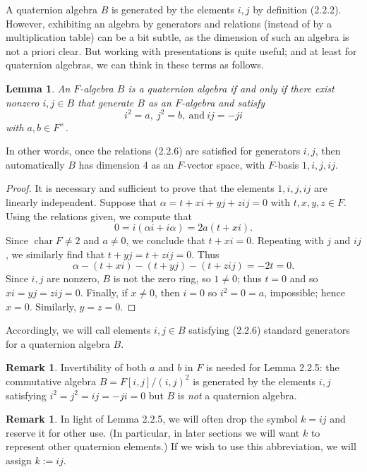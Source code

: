 \documentclass{article}
\newtheorem{lemma}[theorem]{Lemma}
\theoremstyle{definition}
\newtheorem{remark}[theorem]{Remark}
\begin{document}
A quaternion algebra $B$ is generated by the elements $i, j$ by definition (2.2.2). However, exhibiting an algebra by generators and relations (instead of by a multiplication table) can be a bit subtle, as the dimension of such an algebra is not a priori clear. But working with presentations is quite useful; and at least for quaternion algebras, we can think in these terms as follows.

\begin{lemma}
An $F$-algebra $B$ is a quaternion algebra if and only if there exist nonzero $i, j \in B$ that generate $B$ as an $F$-algebra and satisfy
$$i^2 = a, \ j^2 = b, \ \text{and} \ ij = -ji \tag{2.2.6}$$
with $a, b \in F^\times$.
\end{lemma}

In other words, once the relations (2.2.6) are satisfied for generators $i, j$, then automatically $B$ has dimension 4 as an $F$-vector space, with $F$-basis $1, i, j, ij$.

\begin{proof}
It is necessary and sufficient to prove that the elements $1, i, j, ij$ are linearly independent. Suppose that $\alpha = t + xi + yj + zij = 0$ with $t, x, y, z \in F$. Using the relations given, we compute that
$$0 = i(\alpha i + i\alpha) = 2a(t + xi).$$
Since $\operatorname{char} F \neq 2$ and $a \neq 0$, we conclude that $t + xi = 0$. Repeating with $j$ and $ij$, we similarly find that $t + yj = t + zij = 0$. Thus
$$\alpha - (t + xi) - (t + yj) - (t + zij) = -2t = 0.$$
Since $i, j$ are nonzero, $B$ is not the zero ring, so $1 \neq 0$; thus $t = 0$ and so $xi = yj = zij = 0$. Finally, if $x \neq 0$, then $i = 0$ so $i^2 = 0 = a$, impossible; hence $x = 0$. Similarly, $y = z = 0$.
\end{proof}

Accordingly, we will call elements $i, j \in B$ satisfying (2.2.6) standard generators for a quaternion algebra $B$.

\begin{remark}
Invertibility of both $a$ and $b$ in $F$ is needed for Lemma 2.2.5: the commutative algebra $B = F[i, j]/(i, j)^2$ is generated by the elements $i, j$ satisfying $i^2 = j^2 = ij = -ji = 0$ but $B$ is \emph{not} a quaternion algebra.
\end{remark}

\begin{remark}
In light of Lemma 2.2.5, we will often drop the symbol $k = ij$ and reserve it for other use. (In particular, in later sections we will want $k$ to represent other quaternion elements.) If we wish to use this abbreviation, we will assign $k := ij$.
\end{remark}
\end{document}
